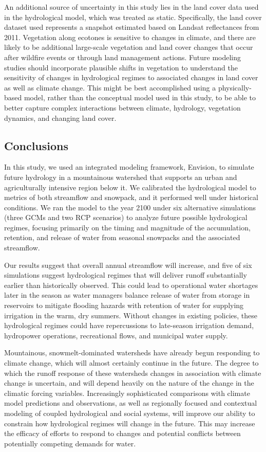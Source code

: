 \documentclass[11pt,letterpaper]{article}
\begin{document}
An additional source of uncertainty in this study lies in the land cover data used in the hydrological model, which was treated as static. Specifically, the land cover dataset used represents a snapshot estimated based on Landsat reflectances from 2011. Vegetation along ecotones is sensitive to changes in climate, and there are likely to be additional large-scale vegetation and land cover changes that occur after wildfire events or through land management actions. Future modeling studies should incorporate plausible shifts in vegetation to understand the sensitivity of changes in hydrological regimes to associated changes in land cover as well as climate change. This might be best accomplished using a physically-based model, rather than the conceptual model used in this study, to be able to better capture complex interactions between climate, hydrology, vegetation dynamics, and changing land cover.

\subsection{Conclusions}

In this study, we used an integrated modeling framework, Envision, to simulate future hydrology in a mountainous watershed that supports an urban and agriculturally intensive region below it. We calibrated the hydrological model to metrics of both streamflow and snowpack, and it performed well under historical conditions. We ran the model to the year 2100 under six alternative simulations (three GCMs and two RCP scenarios) to analyze future possible hydrological regimes, focusing primarily on the timing and magnitude of the accumulation, retention, and release of water from seasonal snowpacks and the associated streamflow. 

Our results suggest that overall annual streamflow will increase, and five of six simulations suggest hydrological regimes that will deliver runoff substantially earlier than historically observed. This could lead to operational water shortages later in the season as water managers balance release of water from storage in reservoirs to mitigate flooding hazards with retention of water for supplying irrigation in the warm, dry summers. Without changes in existing policies, these hydrological regimes could have repercussions to late-season irrigation demand, hydropower operations, recreational flows, and municipal water supply. 

Mountainous, snowmelt-dominated watersheds have already begun responding to climate change, which will almost certainly continue in the future. The degree to which the runoff response of these watersheds changes in association with climate change is uncertain, and will depend heavily on the nature of the change in the climatic forcing variables. Increasingly sophisticated comparisons with climate model predictions and observations, as well as regionally focused and contextual modeling of coupled hydrological and social systems, will improve our ability to constrain how hydrological regimes will change in the future. This may increase the efficacy of efforts to respond to changes and potential conflicts between potentially competing demands for water.
\end{document}
